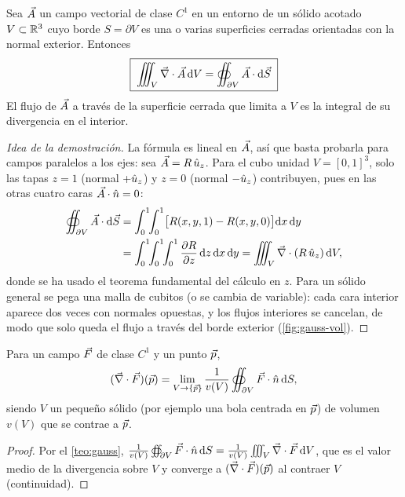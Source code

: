 \begin{teorema}\label{teo:gauss}
Sea $\vec{A}$ un campo vectorial de clase $C^{1}$ en un entorno de un sólido
acotado $V\subset\mathbb{R}^{3}$ cuyo borde $S=\partial V$ es una o varias superficies
cerradas orientadas con la normal exterior. Entonces
\begin{equation}\label{eq:gauss}
  \boxed{\;\iiint_{V}\vec{\nabla}\cdot\vec{A}\,\mathrm{d} V=\oiint_{\partial V}\vec{A}\cdot\mathrm{d}\vec{S}\;}
\end{equation}
El flujo de $\vec{A}$ a través de la superficie cerrada que limita a $V$ es la
integral de su divergencia en el interior.
\end{teorema}
\begin{proof}[Idea de la demostración]
La fórmula es lineal en $\vec{A}$, así que basta probarla para campos paralelos
a los ejes: sea $\vec{A}=R\,\hat{u}_{z}$. Para el cubo unidad $V=[0,1]^{3}$, solo las
tapas $z=1$ (normal $+\hat{u}_{z}$) y $z=0$ (normal $-\hat{u}_{z}$) contribuyen, pues en las
otras cuatro caras $\vec{A}\cdot\hat{n}=0$:
\begin{align*}
  \oiint_{\partial V}\vec{A}\cdot\mathrm{d}\vec{S}&=\int_0^1\!\!\int_0^1\bigl[R(x,y,1)-R(x,y,0)\bigr]\mathrm{d} x\,\mathrm{d} y\\
  &=\int_0^1\!\!\int_0^1\!\!\int_0^1\frac{\partial R}{\partial z}\,\mathrm{d} z\,\mathrm{d} x\,\mathrm{d} y=\iiint_V\vec{\nabla}\cdot(R\,\hat{u}_{z})\,\mathrm{d} V ,
\end{align*}
donde se ha usado el teorema fundamental del cálculo en $z$. Para un sólido
general se pega una malla de cubitos (o se cambia de variable): cada cara
interior aparece dos veces con normales opuestas, y los flujos interiores se
cancelan, de modo que solo queda el flujo a través del borde exterior
(\cref{fig:gauss-vol}).
\end{proof}

\begin{proposicion}\label{prop:div-intrinseca}
Para un campo $\vec{F}$ de clase $C^{1}$ y un punto $\vec{p}$,
\begin{equation}\label{eq:div-intrinseca}
  (\vec{\nabla}\cdot\vec{F})(\vec{p})=\lim_{V\to\{\vec{p}\}}\frac{1}{v(V)}\oiint_{\partial V}\vec{F}\cdot\hat{n}\,\mathrm{d} S ,
\end{equation}
siendo $V$ un pequeño sólido (por ejemplo una bola centrada en $\vec{p}$) de volumen
$v(V)$ que se contrae a $\vec{p}$.
\end{proposicion}
\begin{proof}
Por el \cref{teo:gauss}, $\frac{1}{v(V)}\oiint_{\partial V}\vec{F}\cdot\hat{n}\,\mathrm{d} S=\frac{1}{v(V)}\iiint_V\vec{\nabla}\cdot\vec{F}\,\mathrm{d} V$,
que es el valor medio de la divergencia sobre $V$ y converge a $(\vec{\nabla}\cdot\vec{F})(\vec{p})$
al contraer $V$ (continuidad).
\end{proof}

